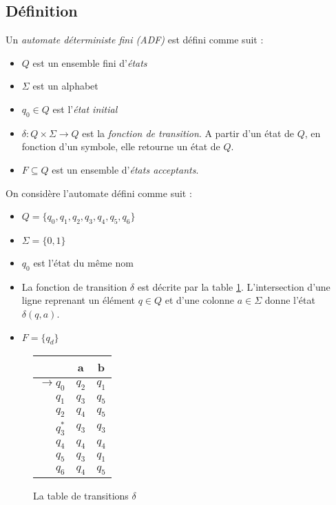 	\subsection{Définition}\label{sub:dfa}
	
	Un \emph{automate déterministe fini (ADF)} \automaton est défini comme suit :
	\begin{itemize}
		\item $Q$ est un ensemble fini d'\emph{états}
		\item $\Sigma$ est un alphabet
		\item $q_0 \in Q$ est l'\emph{état initial}
		\item $\delta : Q \times \Sigma \rightarrow Q$ est la \emph{fonction de transition}. A partir d'un état de $Q$, en fonction d'un symbole, elle retourne un état de $Q$.
		\item $F \subseteq Q$ est un ensemble d'\emph{états acceptants}.
	\end{itemize}
	
	\begin{exemple}\label{ex:adf}
		On considère l'automate \automaton défini comme suit :
		\begin{itemize}
			\item $Q=\{q_0,q_1,q_2,q_3,q_4,q_5,q_6\}$
			\item $\Sigma=\{0,1\}$
			\item $q_0$ est l'état du même nom
			\item La fonction de transition $\delta$ est décrite par la table \ref{fig:transdelta}. L'intersection d'une ligne reprenant un élément $q \in Q$ et d'une colonne $a \in \Sigma$ donne l'état $\delta(q,a)$.
			\item $F=\{q_d\}$
		\end{itemize}
	
		\begin{figure}[H]
			\centering
			\begin{tabular}{|r||c|c|}
				\hline
				&a&b\\
				\hline\hline
				$\rightarrow q_0$&$q_2$&$q_1$\\\hline
				$q_1$&$q_3$&$q_5$\\\hline
				$q_2$&$q_4$&$q_5$\\\hline
				$q_3^*$&$q_3$&$q_3$\\\hline
				$q_4$&$q_4$&$q_4$\\\hline
				$q_5$&$q_3$&$q_1$\\\hline
				$q_6$&$q_4$&$q_5$\\\hline
			\end{tabular}
			\caption{La table de transitions $\delta$}
			\label{fig:transdelta}
		\end{figure}
	\end{exemple}
	 
